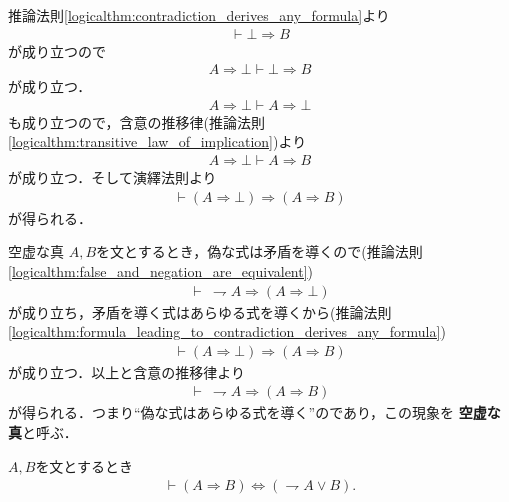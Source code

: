 	\begin{prf}
		推論法則\ref{logicalthm:contradiction_derives_any_formula}より
		\begin{align}
			\vdash \bot \Longrightarrow B
		\end{align}
		が成り立つので
		\begin{align}
			A \Longrightarrow \bot \vdash \bot \Longrightarrow B
		\end{align}
		が成り立つ．
		\begin{align}
			A \Longrightarrow \bot \vdash A \Longrightarrow \bot
		\end{align}
		も成り立つので，含意の推移律(推論法則\ref{logicalthm:transitive_law_of_implication})より
		\begin{align}
			A \Longrightarrow \bot \vdash A \Longrightarrow B
		\end{align}
		が成り立つ．そして演繹法則より
		\begin{align}
			\vdash (A \Longrightarrow \bot) \Longrightarrow (A \Longrightarrow B)
		\end{align}
		が得られる．
		\QED
	\end{prf}
	
	\begin{itembox}[l]{空虚な真}
		$A,B$を文とするとき，偽な式は矛盾を導くので(推論法則\ref{logicalthm:false_and_negation_are_equivalent})
		\begin{align}
			\vdash\ \rightharpoondown A \Longrightarrow (A \Longrightarrow \bot)
		\end{align}
		が成り立ち，矛盾を導く式はあらゆる式を導くから(推論法則\ref{logicalthm:formula_leading_to_contradiction_derives_any_formula})
		\begin{align}
			\vdash (A \Longrightarrow \bot) \Longrightarrow (A \Longrightarrow B)
		\end{align}
		が成り立つ．以上と含意の推移律より
		\begin{align}
			\vdash\ \rightharpoondown A \Longrightarrow (A \Longrightarrow B)
		\end{align}
		が得られる．つまり``偽な式はあらゆる式を導く''のであり，この現象を
		{\bf 空虚な真}と呼ぶ．
	\end{itembox}
	
	\begin{screen}
		\begin{logicalthm}[含意は否定と論理和で表せる]\label{logicalthm:rule_of_inference_3}
			$A,B$を文とするとき
			\begin{align}
				\vdash (A \Longrightarrow B) \Longleftrightarrow (\rightharpoondown A \vee B).
			\end{align}
		\end{logicalthm}
	\end{screen}
	
